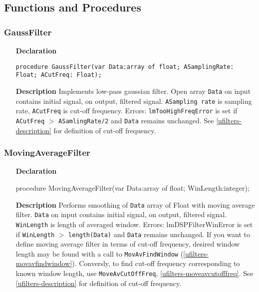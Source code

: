 \documentclass[12pt,a4paper,oneside]{report}
\newcommand{\declarationitem}[1]{\textbf{#1}}
\newcommand{\descriptiontitle}[1]{\textbf{#1}}
\newcommand{\code}[1]{\texttt{#1}}
\begin{document}
\subsection{Functions and Procedures}
\subsubsection{GaussFilter}
\label{ufilters-gaussfilter}
\begin{itemize}
	\item[\declarationitem{Declaration}\hfill]
	\begin{flushleft}
\code{procedure GaussFilter(var Data:array of float; ASamplingRate: Float;  ACutFreq: Float);}	
	\end{flushleft}
	\item[\descriptiontitle{Description}]
	Implements low-pass gaussian filter. Open array \code{Data} on input contains initial signal, on output, filtered signal. \code{ASampling rate} is sampling rate, \code{ACutFreq} is cut-off frequency. Errors: \code{lmTooHighFreqError} is set if \code{ACutFreq} $>$ \code{ASamlingRate/2} and \code{Data} remains unchanged. See \ref{ufilters-description} for definition of cut-off frequency.
\end{itemize}	
\subsubsection{MovingAverageFilter}
\label{ufilters-movingaveragefilter}
\begin{itemize}
	\item[\declarationitem{Declaration}\hfill]
	\begin{flushleft}
	procedure MovingAverageFilter(var Data:array of float; WinLength:integer);
	\end{flushleft}
	\item[\descriptiontitle{Description}]
	Performs smoothing of \code{Data} array of Float with moving average filter. \code{Data} on input contains initial signal, on output, filtered signal. \code{WinLength} is length of averaged window. Errors: lmDSPFilterWinError is set if \code{WinLength} $>$ \code{length(Data)} and \code{Data} remains unchanged. If you want to define moving average filter in terms of cut-off frequency, desired window length may be found with a call to \code{MovAvFindWindow} (\ref{ufilters-movavfindwindow}). Conversly, to find cut-off frequency corresponding to known window length, use \code{MoveAvCutOffFreq}, \ref{ufilters-moveavcutofffreq}.  See \ref{ufilters-description} for definition of cut-off frequency.
\end{itemize}	
\end{document}
